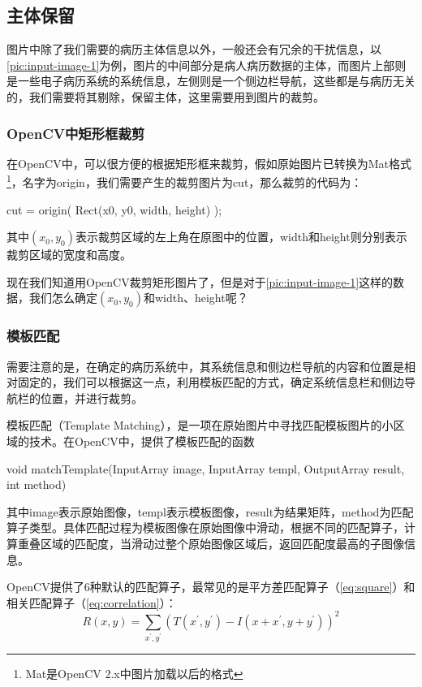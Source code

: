 \subsection{主体保留}
图片中除了我们需要的病历主体信息以外，一般还会有冗余的干扰信息，以\autoref{pic:input-image-1}为例，图片的中间部分是病人病历数据的主体，而图片上部则是一些电子病历系统的系统信息，左侧则是一个侧边栏导航，这些都是与病历无关的，我们需要将其剔除，保留主体，这里需要用到图片的裁剪。

\subsubsection*{OpenCV中矩形框裁剪}
在OpenCV中，可以很方便的根据矩形框来裁剪，假如原始图片已转换为Mat格式\footnote{Mat是OpenCV 2.x中图片加载以后的格式}，名字为origin，我们需要产生的裁剪图片为cut，那么裁剪的代码为：
\begin{Code}
cut = origin( Rect(x0, y0, width, height) );
\end{Code}
其中$(x_0,y_0)$表示裁剪区域的左上角在原图中的位置，width和height则分别表示裁剪区域的宽度和高度。

现在我们知道用OpenCV裁剪矩形图片了，但是对于\autoref{pic:input-image-1}这样的数据，我们怎么确定$(x_0,y_0)$和width、height呢？

\subsubsection*{模板匹配}
需要注意的是，在确定的病历系统中，其系统信息和侧边栏导航的内容和位置是相对固定的，我们可以根据这一点，利用模板匹配的方式，确定系统信息栏和侧边导航栏的位置，并进行裁剪。

模板匹配（Template Matching）\citep{template-matching}，是一项在原始图片中寻找匹配模板图片的小区域的技术。在OpenCV中，提供了模板匹配的函数
\begin{Code}
void matchTemplate(InputArray image, InputArray templ, OutputArray result, int method)
\end{Code}
其中image表示原始图像，templ表示模板图像，result为结果矩阵，method为匹配算子类型。具体匹配过程为模板图像在原始图像中滑动，根据不同的匹配算子，计算重叠区域的匹配度，当滑动过整个原始图像区域后，返回匹配度最高的子图像信息。

OpenCV提供了6种默认的匹配算子，最常见的是平方差匹配算子（\autoref{eq:square}）和相关匹配算子（\autoref{eq:correlation}）：
\begin{equation} \label{eq:square}
R(x,y)=\sum_{x^{'},y^{'}}(T(x^{'},y^{'})-I(x+x^{'},y+y^{'}))^2
\end{equation}

